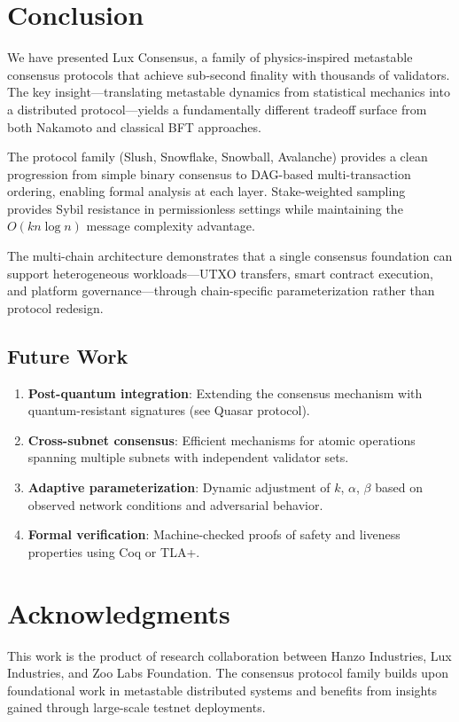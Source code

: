 \section{Conclusion}
\label{sec:conclusion}

We have presented Lux Consensus, a family of physics-inspired metastable consensus protocols that achieve sub-second finality with thousands of validators. The key insight---translating metastable dynamics from statistical mechanics into a distributed protocol---yields a fundamentally different tradeoff surface from both Nakamoto and classical BFT approaches.

The protocol family (Slush, Snowflake, Snowball, Avalanche) provides a clean progression from simple binary consensus to DAG-based multi-transaction ordering, enabling formal analysis at each layer. Stake-weighted sampling provides Sybil resistance in permissionless settings while maintaining the $O(kn \log n)$ message complexity advantage.

The multi-chain architecture demonstrates that a single consensus foundation can support heterogeneous workloads---UTXO transfers, smart contract execution, and platform governance---through chain-specific parameterization rather than protocol redesign.

\subsection{Future Work}

\begin{enumerate}
    \item \textbf{Post-quantum integration}: Extending the consensus mechanism with quantum-resistant signatures (see Quasar protocol).
    \item \textbf{Cross-subnet consensus}: Efficient mechanisms for atomic operations spanning multiple subnets with independent validator sets.
    \item \textbf{Adaptive parameterization}: Dynamic adjustment of $k$, $\alpha$, $\beta$ based on observed network conditions and adversarial behavior.
    \item \textbf{Formal verification}: Machine-checked proofs of safety and liveness properties using Coq or TLA+.
\end{enumerate}

\section*{Acknowledgments}

This work is the product of research collaboration between Hanzo Industries, Lux Industries, and Zoo Labs Foundation. The consensus protocol family builds upon foundational work in metastable distributed systems and benefits from insights gained through large-scale testnet deployments.
